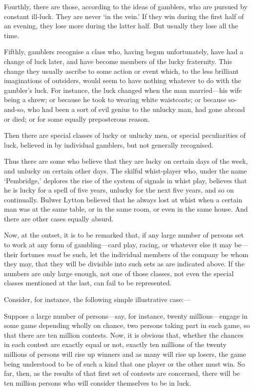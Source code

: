 \documentclass[letterpaper,12pt,oneside,openany]{memoir}
\begin{document}
Fourthly, there are those, according to the ideas of
gamblers, who are pursued by constant ill-luck. They
are never `in the vein.' If they win during the first
half of an evening, they lose more during the latter
half. But usually they lose all the time.

Fifthly, gamblers recognise a class who, having begun
unfortunately, have had a change of luck later, and
have become members of the lucky fraternity. This
change they usually ascribe to some action or event
which, to the less brilliant imaginations of outsiders,
would seem to have nothing whatever to do with the
gambler's luck. For instance, the luck changed when
the man married---his wife being a shrew; or because
he took to wearing white waistcoats; or because so-and-so,
who had been a sort of evil genius to the unlucky
man, had gone abroad or died; or for some equally preposterous
reason.

Then there are special classes of lucky or unlucky
men, or special peculiarities of luck, believed in by
individual gamblers, but not generally recognised.

Thus there are some who believe that they are lucky on
certain days of the week, and unlucky on certain other
days. The skilful whist-player who, under the name
`Pembridge,' deplores the rise of the system of signals
in whist play, believes that he is lucky for a spell of
five years, unlucky for the next five years, and so on
continually. Bulwer Lytton believed that he always
lost at whist when a certain man was at the same table,
or in the same room, or even in the same house. And
there are other cases equally absurd.

Now, at the outset, it is to be remarked that, if any
large number of persons set to work at any form of
gambling---card play, racing, or whatever else it may
be---their fortunes \textit{must} be such, let the individual
members of the company be whom they may, that they
will be divisible into such sets as are indicated above.
If the numbers are only large enough, not one of those
classes, not even the special classes mentioned at the
last, can fail to be represented.

Consider, for instance, the following simple illustrative
case:---

Suppose a large number of persons---say, for instance,
twenty millions---engage in some game depending
wholly on chance, two persons taking part in each
game, so that there are ten million contests. Now, it is
obvious that, whether the chances in each contest are
exactly equal or not, exactly ten millions of the twenty
millions of persons will rise up winners and as many
will rise up losers, the game being understood to be of
such a kind that one player or the other must win. So
far, then, as the results of that first set of contests are
concerned, there will be ten million persons who will
consider themselves to be in luck.
\end{document}
